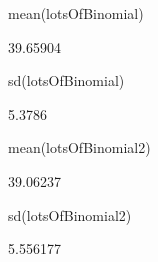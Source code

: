 \begin{Schunk}
\begin{Sinput}
  mean(lotsOfBinomial)
\end{Sinput}
\begin{Soutput}
[1] 39.65904
\end{Soutput}
\begin{Sinput}
  sd(lotsOfBinomial)
\end{Sinput}
\begin{Soutput}
[1] 5.3786
\end{Soutput}
\begin{Sinput}
  mean(lotsOfBinomial2)
\end{Sinput}
\begin{Soutput}
[1] 39.06237
\end{Soutput}
\begin{Sinput}
  sd(lotsOfBinomial2)
\end{Sinput}
\begin{Soutput}
[1] 5.556177
\end{Soutput}
\end{Schunk}
